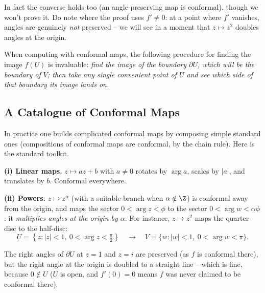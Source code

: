 In fact the converse holds too (an angle-preserving map is conformal), though we won't prove it. Do note where the proof uses $f' \neq 0$: at a point where $f'$ vanishes, angles are genuinely \emph{not} preserved -- we will see in a moment that $z \mapsto z^2$ doubles angles at the origin.

When computing with conformal maps, the following procedure for finding the image $f(U)$ is invaluable: \emph{find the image of the boundary $\partial U$, which will be the boundary of $V$; then take any single convenient point of $U$ and see which side of that boundary its image lands on.}

\subsection{A Catalogue of Conformal Maps}

In practice one builds complicated conformal maps by composing simple standard ones (compositions of conformal maps are conformal, by the chain rule). Here is the standard toolkit.

\textbf{(i) Linear maps.} $z \mapsto az + b$ with $a \neq 0$ rotates by $\arg a$, scales by $|a|$, and translates by $b$. Conformal everywhere.

\textbf{(ii) Powers.} $z \mapsto z^\alpha$ (with a suitable branch when $\alpha \notin \Z$) is conformal away from the origin, and maps the sector $0 < \arg z < \phi$ to the sector $0 < \arg w < \alpha\phi$: it \emph{multiplies angles at the origin by $\alpha$}. For instance, $z \mapsto z^2$ maps the quarter-disc to the half-disc:
$$
U = \left\{z : |z| < 1, \ 0 < \arg z < \tfrac{\pi}{2}\right\} \quad \longrightarrow \quad V = \{w : |w| < 1, \ 0 < \arg w < \pi\}.
$$
\begin{center}
\end{center}
The right angles of $\partial U$ at $z = 1$ and $z = i$ are preserved (as $f$ is conformal there), but the right angle at the origin is doubled to a straight line -- which is fine, because $0 \notin U$ ($U$ is open, and $f'(0) = 0$ means $f$ was never claimed to be conformal there).

